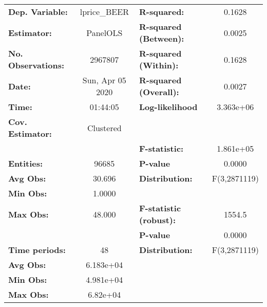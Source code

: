 \documentclass{report}a
\begin{document}
\begin{center}
\begin{tabular}{lclc}
\toprule
\textbf{Dep. Variable:}       &    lprice\_BEER    & \textbf{  R-squared:         }   &      0.1628      \\
\textbf{Estimator:}           &      PanelOLS      & \textbf{  R-squared (Between):}  &      0.0025      \\
\textbf{No. Observations:}    &      2967807       & \textbf{  R-squared (Within):}   &      0.1628      \\
\textbf{Date:}                &  Sun, Apr 05 2020  & \textbf{  R-squared (Overall):}  &      0.0027      \\
\textbf{Time:}                &      01:44:05      & \textbf{  Log-likelihood     }   &    3.363e+06     \\
\textbf{Cov. Estimator:}      &     Clustered      & \textbf{                     }   &                  \\
\textbf{}                     &                    & \textbf{  F-statistic:       }   &    1.861e+05     \\
\textbf{Entities:}            &       96685        & \textbf{  P-value            }   &      0.0000      \\
\textbf{Avg Obs:}             &       30.696       & \textbf{  Distribution:      }   &   F(3,2871119)   \\
\textbf{Min Obs:}             &       1.0000       & \textbf{                     }   &                  \\
\textbf{Max Obs:}             &       48.000       & \textbf{  F-statistic (robust):} &      1554.5      \\
\textbf{}                     &                    & \textbf{  P-value            }   &      0.0000      \\
\textbf{Time periods:}        &         48         & \textbf{  Distribution:      }   &   F(3,2871119)   \\
\textbf{Avg Obs:}             &     6.183e+04      & \textbf{                     }   &                  \\
\textbf{Min Obs:}             &     4.981e+04      & \textbf{                     }   &                  \\
\textbf{Max Obs:}             &      6.82e+04      & \textbf{                     }   &                  \\
\bottomrule
\end{tabular}
\begin{tabular}{lcccccc}

\end{tabular}
\end{center}
\end{document}
